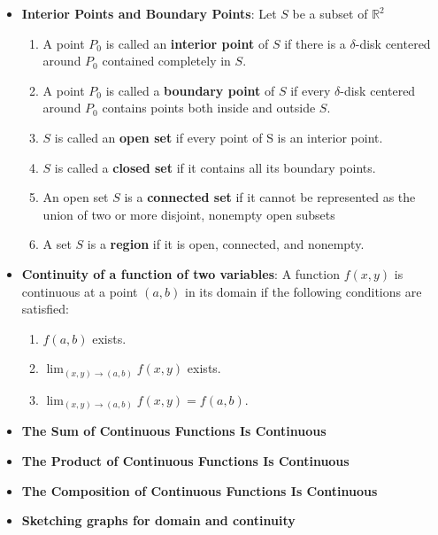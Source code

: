 \documentclass{report}
\begin{document}
\begin{itemize}
            \item \textbf{Interior Points and Boundary Points}:
                Let $S$ be a subset of $\mathbb{R}^2$ 
                \begin{enumerate}[label=(\alph*)]
                    \item A point $P_0$ is called an \textbf{interior point} of $S$ if there is a $\delta$-disk centered around $P_0$ contained completely in $S$.
                    \item A point $P_0$ is called a \textbf{boundary point} of $S$ if every $\delta$-disk centered around $P_0$ contains points both inside and outside $S$.
                    \item $S$ is called an \textbf{open set} if every point of S is an interior point. 
                    \item $S$ is called a \textbf{closed set} if it contains all its boundary points.
                    \item An open set  $S$ is a \textbf{connected set} if it cannot be represented as the union of two or more disjoint, nonempty open subsets 
                    \item A set $S$ is a \textbf{region} if it is open, connected, and nonempty.
                \end{enumerate}
                \bigbreak \noindent 
            \item \textbf{Continuity of a function of two variables}:
                A function $f(x,y)$ is continuous at a point $(a,b)$ in its domain if the following conditions are satisfied:
                \begin{enumerate}
                    \item $f(a,b)$ exists.
                    \item $\lim_{(x,y) \to (a,b)} f(x,y)$ exists.
                    \item $\lim_{(x,y) \to (a,b)} f(x,y) = f(a,b)$.
                \end{enumerate}
            \item \textbf{The Sum of Continuous Functions Is Continuous}
            \item \textbf{The Product of Continuous Functions Is Continuous}
            \item \textbf{The Composition of Continuous Functions Is Continuous}
            \item \textbf{Sketching graphs for domain and continuity}
                \begin{itemize}

\end{itemize}
\end{itemize}
\end{document}
